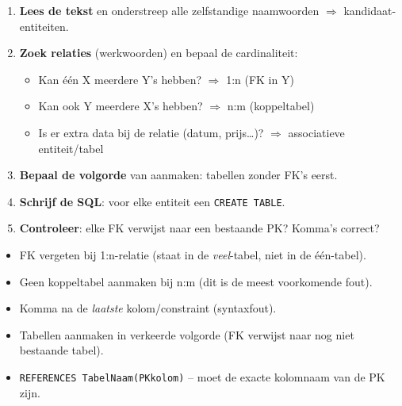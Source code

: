 \documentclass[a4paper,11pt]{article}
\begin{document}
\begin{conceptbox}
\begin{enumerate}
  \item \textbf{Lees de tekst} en onderstreep alle zelfstandige naamwoorden $\Rightarrow$ kandidaat-entiteiten.
  \item \textbf{Zoek relaties} (werkwoorden) en bepaal de cardinaliteit:
    \begin{itemize}
      \item Kan één X meerdere Y's hebben? $\Rightarrow$ 1:n (FK in Y)
      \item Kan ook Y meerdere X's hebben? $\Rightarrow$ n:m (koppeltabel)
      \item Is er extra data bij de relatie (datum, prijs\ldots)? $\Rightarrow$ associatieve entiteit/tabel
    \end{itemize}
  \item \textbf{Bepaal de volgorde} van aanmaken: tabellen zonder FK's eerst.
  \item \textbf{Schrijf de SQL}: voor elke entiteit een \texttt{CREATE TABLE}.
  \item \textbf{Controleer}: elke FK verwijst naar een bestaande PK? Komma's correct?
\end{enumerate}
\end{conceptbox}

\begin{waarschuwing}
\begin{itemize}
  \item FK vergeten bij 1:n-relatie (staat in de \emph{veel}-tabel, niet in de één-tabel).
  \item Geen koppeltabel aanmaken bij n:m (dit is de meest voorkomende fout).
  \item Komma na de \emph{laatste} kolom/constraint (syntaxfout).
  \item Tabellen aanmaken in verkeerde volgorde (FK verwijst naar nog niet bestaande tabel).
  \item \texttt{REFERENCES TabelNaam(PKkolom)} -- moet de exacte kolomnaam van de PK zijn.
\end{itemize}
\end{waarschuwing}
\end{document}
